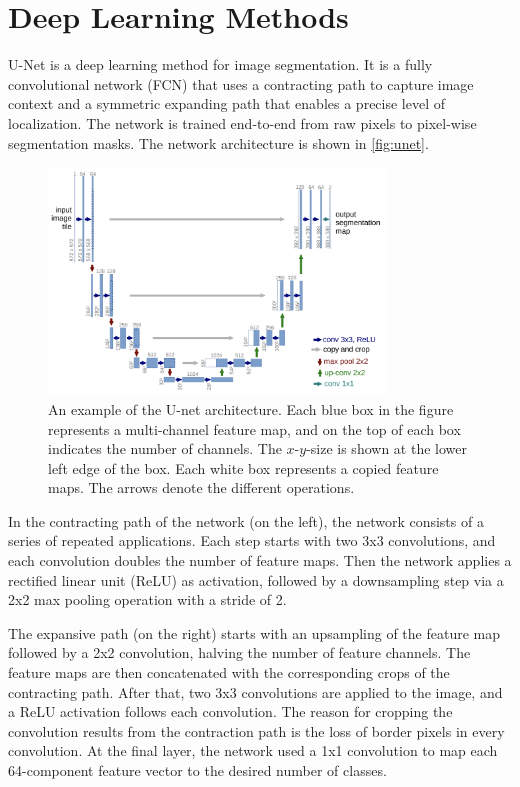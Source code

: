 \section{Deep Learning Methods}
U-Net \cite{ronneberger2015u} is a deep learning method for image segmentation. It is a fully convolutional network (FCN) \cite{long2015fully} that uses a contracting path to capture image context and a symmetric expanding path that enables a precise level of localization. The network is trained end-to-end from raw pixels to pixel-wise segmentation masks. The network architecture is shown in \autoref{fig:unet}. \medskip
\begin{figure}[H]
    \centering
    \includegraphics[width=0.8\textwidth]{./figures/unet.png}
    \caption{An example of the U-net architecture. Each blue
    box in the figure represents a multi-channel feature map, and on the top of each box indicates the number of channels. The \(x\)-\(y\)-size is shown at the lower left edge of the box. Each white box represents a copied feature maps. The arrows denote the different operations. \cite{ronneberger2015u}}
    \label{fig:unet}
\end{figure}
\noindent In the contracting path of the network (on the left), the network consists of a series of repeated applications. Each step starts with two 3x3 convolutions, and each convolution doubles the number of feature maps. Then the network applies a rectified linear unit (ReLU) as activation, followed by a downsampling step via a 2x2 max pooling operation with a stride of 2. \medskip

\noindent The expansive path (on the right) starts with an upsampling of the feature map followed by a 2x2 convolution, halving the number of feature channels. The feature maps are then concatenated with the corresponding crops of the contracting path. After that, two 3x3 convolutions are applied to the image, and a ReLU activation follows each convolution. The reason for cropping the convolution results from the contraction path is the loss of border pixels in every convolution. At the final layer, the network used a 1x1 convolution to map each 64-component feature vector to the desired number of classes. \medskip

